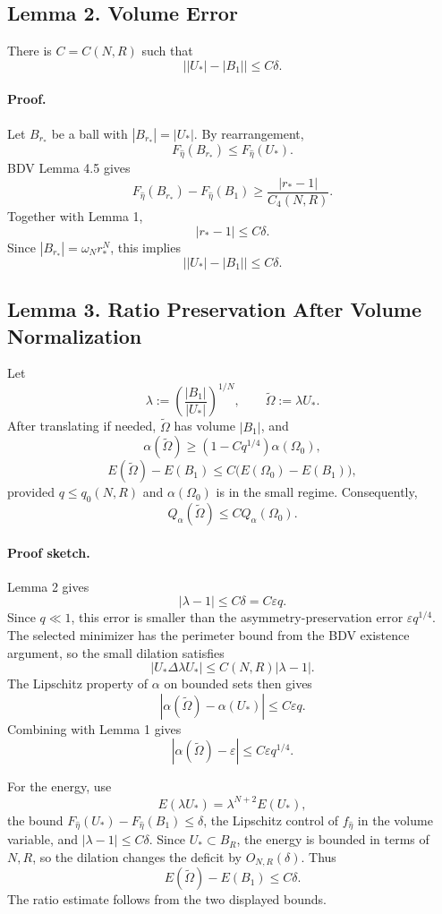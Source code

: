 \documentclass[11pt]{article}
\begin{document}
\subsection*{Lemma 2. Volume Error}

There is \(C=C(N,R)\) such that
\[
\bigl||U_*|-|B_1|\bigr|
\le
C\delta.
\]

\paragraph{Proof.}
Let \(B_{r_*}\) be a ball with \(|B_{r_*}|=|U_*|\). By rearrangement,
\[
F_{\hat\eta}(B_{r_*})\le F_{\hat\eta}(U_*).
\]
BDV Lemma 4.5 gives
\[
F_{\hat\eta}(B_{r_*})-F_{\hat\eta}(B_1)
\ge
\frac{|r_*-1|}{C_4(N,R)}.
\]
Together with Lemma 1,
\[
|r_*-1|\le C\delta.
\]
Since \(|B_{r_*}|=\omega_N r_*^N\), this implies
\[
\bigl||U_*|-|B_1|\bigr|\le C\delta.
\]

\subsection*{Lemma 3. Ratio Preservation After Volume Normalization}

Let
\[
\lambda:=\left(\frac{|B_1|}{|U_*|}\right)^{1/N},
\qquad
\widetilde\Omega:=\lambda U_*.
\]
After translating if needed, \(\widetilde\Omega\) has volume \(|B_1|\), and
\[
\alpha(\widetilde\Omega)
\ge
\left(1-Cq^{1/4}\right)\alpha(\Omega_0),
\]
\[
E(\widetilde\Omega)-E(B_1)
\le
C\big(E(\Omega_0)-E(B_1)\big),
\]
provided \(q\le q_0(N,R)\) and \(\alpha(\Omega_0)\) is in the small regime.
Consequently,
\[
Q_\alpha(\widetilde\Omega)
\le
C Q_\alpha(\Omega_0).
\]

\paragraph{Proof sketch.}
Lemma 2 gives
\[
|\lambda-1|\le C\delta=C\varepsilon q.
\]
Since \(q\ll1\), this error is smaller than the asymmetry-preservation error
\(\varepsilon q^{1/4}\). The selected minimizer has the perimeter bound from
the BDV existence argument, so the small dilation satisfies
\[
|U_*\Delta \lambda U_*|
\le C(N,R)|\lambda-1|.
\]
The Lipschitz property of \(\alpha\) on bounded sets then gives
\[
|\alpha(\widetilde\Omega)-\alpha(U_*)|
\le C\varepsilon q.
\]
Combining with Lemma 1 gives
\[
|\alpha(\widetilde\Omega)-\varepsilon|
\le C\varepsilon q^{1/4}.
\]

For the energy, use
\[
E(\lambda U_*)=\lambda^{N+2}E(U_*),
\]
the bound \(F_{\hat\eta}(U_*)-F_{\hat\eta}(B_1)\le\delta\), the Lipschitz
control of \(f_{\hat\eta}\) in the volume variable, and
\(|\lambda-1|\le C\delta\). Since \(U_*\subset B_R\), the energy is bounded in
terms of \(N,R\), so the dilation changes the deficit by \(O_{N,R}(\delta)\).
Thus
\[
E(\widetilde\Omega)-E(B_1)\le C\delta.
\]
The ratio estimate follows from the two displayed bounds.
\end{document}
